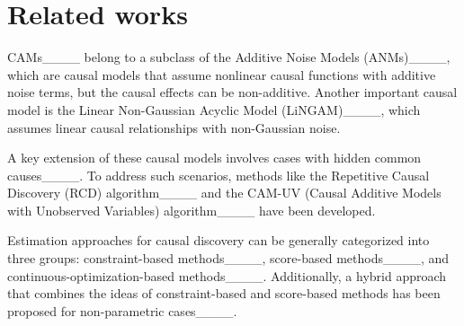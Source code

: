 \section{Related works}
\label{sec:related_works}
CAMs____ belong to a subclass of the Additive Noise Models (ANMs)____, which are causal models that assume nonlinear causal functions with additive noise terms, but the causal effects can be non-additive. Another important causal model is the Linear Non-Gaussian Acyclic Model (LiNGAM)____, which assumes linear causal relationships with non-Gaussian noise.

A key extension of these causal models involves cases with hidden common causes____. To address such scenarios, methods like the Repetitive Causal Discovery (RCD) algorithm____ and the CAM-UV (Causal Additive Models with Unobserved Variables) algorithm____ have been developed.

Estimation approaches for causal discovery can be generally categorized into three groups: constraint-based methods____, score-based methods____, and continuous-optimization-based methods____. Additionally, a hybrid approach that combines the ideas of constraint-based and score-based methods has been proposed for non-parametric cases____.